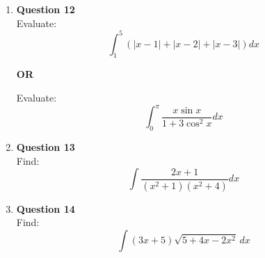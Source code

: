 \documentclass[12pt]{article}
\begin{document}
\begin{enumerate}
\item \textbf{Question 12} \\
Evaluate:
\[
\int_1^5 \left( |x - 1| + |x - 2| + |x - 3| \right) dx
\]
\begin{center}
\textbf{OR} \\
\end{center}
Evaluate:
\[
\int_0^{\pi} \frac{x \sin x}{1 + 3 \cos^2 x} dx
\]

\item \textbf{Question 13} \\
Find:
\[
\int \frac{2x + 1}{(x^2 + 1)(x^2 + 4)} dx
\]

\item \textbf{Question 14} \\
Find:
\[
\int (3x + 5)\sqrt{5 + 4x - 2x^2} \, dx
\]

\end{enumerate}
\end{document}
